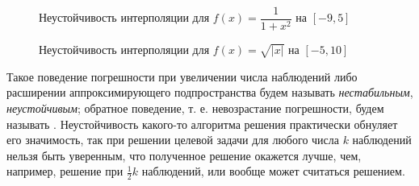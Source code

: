 \documentclass[a4paper]{article}
\begin{document}
\begin{figure}[tbh]
  \noindent{}
  \caption{Неустойчивость интерполяции для $f(x)=\dfrac{1}{1+x^2}$ на $[-9,5]$}
  \label{runge1}
\end{figure}
\begin{figure}[tbh]
  \noindent{}
  \caption{Неустойчивость интерполяции для $f(x)=\sqrt{|x|}$ на $[-5,10]$}
  \label{runge2}
\end{figure}

Такое поведение погрешности при увеличении числа наблюдений либо расширении аппроксимирующего подпространства будем называть {\it нестабильным}, {\it неустойчивым}; обратное поведение, т. е. невозрастание погрешности, будем называть {}.
Неустойчивость какого-то алгоритма решения практически обнуляет его значимость,
так при решении целевой задачи для любого числа $k$ наблюдений нельзя быть уверенным,
что полученное решение окажется лучше, чем, например, решение при $\frac{1}{2}k$ наблюдений, или вообще может считаться решением.
\end{document}
